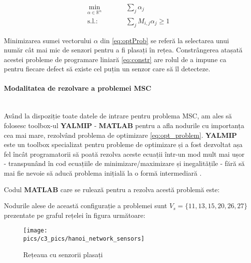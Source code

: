 \begin{subequations}
\begin{alignat}{2}
&\!\min_{\alpha \in \mathbb{R}^n}        &\qquad& \sum_{j} \alpha_{j} \label{eq:optProb}\\
&\text{s.l.:} &      & \sum_{j} M_{i,j}\alpha_{j} \geq 1 \label{eq:constr}
\end{alignat}
\label{eq:opt_problem}
\end{subequations}

 Minimizarea sumei vectorului $\alpha$ din \ref{eq:optProb} se referă la selectarea unui număr cât mai mic de senzori pentru a fi plasați în rețea. Constrângerea atașată acestei probleme de programare liniară \eqref{eq:constr} are rolul de a impune ca pentru fiecare defect să existe cel puțin un senzor care să îl detecteze.
 
\paragraph{Modalitatea de rezolvare a problemei MSC} \mbox{} \\
Având la dispoziție toate datele de intrare pentru problema MSC, am ales să folosesc toolbox-ul \textbf{YALMIP} - \textbf{MATLAB} pentru a afla nodurile cu importanța cea mai mare, rezolvând problema de optimizare \eqref{eq:opt_problem}. \textbf{YALMIP} este un toolbox specializat pentru probleme de optimizare și a fost dezvoltat așa fel încât programatorii să poată rezolva aceste ecuații într-un mod mult mai ușor - transpunând în cod ecuațiile de minimizare/maximizare și inegalitățile - fără să mai fie nevoie să aducă problema inițială la o formă intermediară \cite{YALMIP}.

Codul \textbf{MATLAB} care se rulează pentru a rezolva acestă problemă este:



Nodurile alese de această configurație a problemei sunt $V_s = \{11, 13, 15,20, 26, 27\}$ prezentate pe graful rețelei în figura următoare:

\begin{figure}[H]
\centering
\texttt{[image: \\pics/c3\_pics/hanoi\_network\_sensors]}
\caption{Rețeaua cu senzorii plasați}
\label{fig:binary_matrix}
\end{figure}

